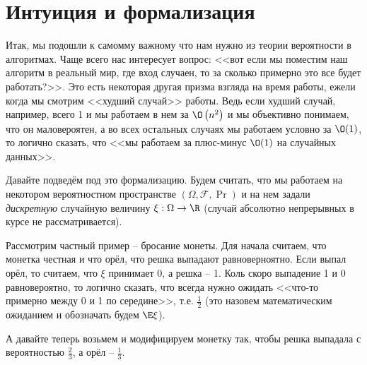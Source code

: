 \section{Интуиция и формализация}

Итак, мы подошли к самомму важному что нам нужно из теории вероятности в алгоритмах. Чаще всего нас интересует вопрос: <<вот если мы поместим наш алгоритм в реальный мир, где вход случаен, то за сколько примерно это все будет работать?>>. Это есть некоторая другая призма взгляда на время работы, ежели когда мы смотрим <<худший случай>> работы. Ведь если худший случай, например, всего 1 и мы работаем в нем за $\O\left(n^2\right)$ и мы объективно понимаем, что он маловероятен, а во всех остальных случаях мы работаем условно за $\O(1)$, то логично сказать, что <<мы работаем за плюс-минус $\O(1)$ на случайных данных>>.

Давайте подведём под это формализацию. Будем считать, что мы работаем на некотором вероятностном пространстве $(\Omega, \mathcal{F}, \Pr)$ и на нем задали \textit{дискретную} случайную величину $\xi: \Omega \to \R$ (случай абсолютно непрерывных в курсе не рассматривается).

Рассмотрим частный пример -- бросание монеты. Для начала считаем, что монетка честная и что орёл, что решка выпадают равноверноятно. Если выпал орёл, то считаем, что $\xi$ принимает 0, а решка -- 1.
Коль скоро выпадение 1 и 0 равновероятно, то логично сказать, что всегда нужно ожидать <<что-то примерно между 0 и 1 по середине>>, т.е. $\frac{1}{2}$ (это назовем математическим ожиданием и обозначать будем $\E \xi$).

\begin{center}
\end{center}

А давайте теперь возьмем и модифицируем монетку так, чтобы решка выпадала с вероятностью $\frac{2}{3}$, а орёл -- $\frac{1}{3}$.

